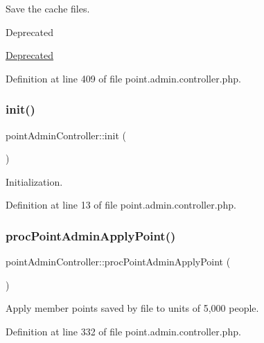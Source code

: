 Save the cache files. 

\begin{DoxyRefDesc}{Deprecated}
\item[\hyperlink{deprecated__deprecated000027}{Deprecated}]\end{DoxyRefDesc}


Definition at line 409 of file point.\+admin.\+controller.\+php.

\hypertarget{classpointAdminController_a739b139aeeef70cf164f5e21dccec06a}{}\label{classpointAdminController_a739b139aeeef70cf164f5e21dccec06a} 
\subsubsection{\texorpdfstring{init()}{init()}}
{\footnotesize\ttfamily point\+Admin\+Controller\+::init (\begin{DoxyParamCaption}{ }\end{DoxyParamCaption})}



Initialization. 



Definition at line 13 of file point.\+admin.\+controller.\+php.

\hypertarget{classpointAdminController_ade85d4289b954ca0c0caadafeb4c115c}{}\label{classpointAdminController_ade85d4289b954ca0c0caadafeb4c115c} 
\subsubsection{\texorpdfstring{proc\+Point\+Admin\+Apply\+Point()}{procPointAdminApplyPoint()}}
{\footnotesize\ttfamily point\+Admin\+Controller\+::proc\+Point\+Admin\+Apply\+Point (\begin{DoxyParamCaption}{ }\end{DoxyParamCaption})}



Apply member points saved by file to units of 5,000 people. 



Definition at line 332 of file point.\+admin.\+controller.\+php.

